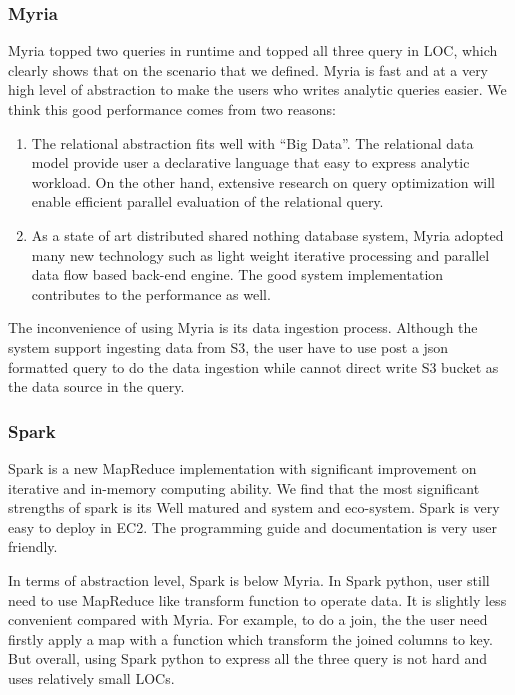 \subsubsection{Myria}
Myria topped two queries in runtime and topped all three query in LOC, which
clearly shows that on the scenario that we defined. Myria is fast and at a 
very high level of abstraction to make the users who writes analytic queries
easier. We think this good performance comes from two reasons:

\begin{enumerate}
    \item The relational abstraction fits well with ``Big Data''. The 
    relational data model provide user a declarative language that easy 
    to express analytic workload. On the other hand, extensive research
    on query optimization will enable efficient parallel evaluation of 
    the relational query.
    \item As a state of art distributed shared nothing database system, 
    Myria adopted many new technology such as light weight iterative 
    processing and parallel data flow based back-end engine. The good 
    system implementation contributes to the performance as well. 
\end{enumerate} 

The inconvenience of using Myria is its data ingestion process. Although the 
system support ingesting data from S3, the user have to use post a json 
formatted query to do the data ingestion while cannot direct write S3 bucket 
as the data source in the query.

\subsubsection{Spark}

Spark is a new MapReduce implementation with significant improvement on 
iterative and in-memory computing ability. We find that the most significant  
strengths of spark is its
Well matured and system and eco-system. Spark is very easy to
deploy in EC2. The programming guide and documentation is very user friendly. 

In terms of abstraction level, Spark is below Myria. In Spark python, user 
still need to use MapReduce like transform function to operate data. It is 
slightly less convenient compared with Myria. For example, to do a join, the 
the user need firstly apply a map with a function which transform the joined 
columns to key. But overall, using Spark python to express all the three query
is not hard and uses relatively small LOCs.


